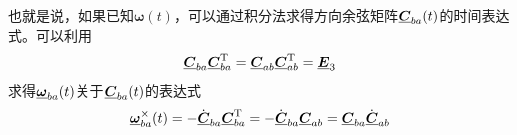 

也就是说，如果已知$\bm{\omega}(t)$，可以通过积分法求得方向余弦矩阵$\underline{\bm{C}}_{ba}(t)$的时间表达式。可以利用
\begin{equation*}
	\underline{\bm{C}}_{ba} \underline{\bm{C}}_{ba}^{\text{T}} = \underline{\bm{C}}_{ab} \underline{\bm{C}}_{ab}^{\text{T}} = \underline{\bm{E}}_3
\end{equation*}
求得$\underline{\bm{\omega}}_{ba}(t)$关于$\underline{\bm{C}}_{ba}(t)$的表达式
\begin{equation}
	\underline{\bm{\omega}}_{ba}^\times (t) = - \dot{\underline{\bm{C}}}_{ba} \underline{\bm{C}}_{ba}^{\text{T}} = - \dot{\underline{\bm{C}}}_{ba} \underline{\bm{C}}_{ab} = \underline{\bm{C}}_{ba} \dot{\underline{\bm{C}}}_{ab}
\end{equation}
\vspace*{0.5em}


\sssection[相继运动的角速度关系]

